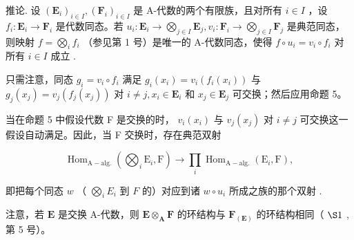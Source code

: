 推论. 设 \((\mathbf{E}_i)_{i\in I}, (\mathbf{F}_i)_{i\in I}\) 是 A-代数的两个有限族，且对所有 \(i\in I\) ，设 \(f_i: \mathbf{E}_i \to \mathbf{F}_i\) 是代数同态。若 \(u_i: \mathbf{E}_i \to \bigotimes_{j\in I} \mathbf{E}_{j}, v_i: \mathbf{F}_i \to \bigotimes_{j\in I} \mathbf{F}_j\) 是典范同态，则映射 \(f = \bigotimes_{i} f_i\) （参见第 1 号）是唯一的 A-代数同态，使得 \(f \circ u_i = v_i \circ f_i\) 对所有 \(i\in I\) 成立 .

只需注意，同态 \(g_{i} = v_{i} \circ f_{i}\) 满足 \(g_{i}(x_{i}) = v_{i}(f_{i}(x_{i}))\) 与 \(g_{j}(x_{j}) = v_{j}(f_{j}(x_{j}))\) 对 \(i \neq j, x_{i} \in \mathbf{E}_{i}\) 和 \(x_{j} \in \mathbf{E}_{j}\) 可交换；然后应用命题 5。

当在命题 5 中假设代数 F 是交换的时， \(v_{i}(x_{i})\) 与 \(v_{j}(x_{j})\) 对 \(i \neq j\) 可交换这一假设自动满足。因此，当 F 交换时，存在典范双射

\[
\operatorname{Hom} _ {\mathrm{A-alg.}} \left(\bigotimes_ {i} \mathrm{E} _ {i}, \mathrm{F}\right)\rightarrow \prod_ {i} \operatorname{Hom} _ {\mathrm{A-alg.}} (\mathrm{E} _ {i}, \mathrm{F}),\tag{6}
\]

即把每个同态 \(w\) （ \(\bigotimes_{i} E_{i}\) 到 \(F\) 的）对应到诸 \(w \circ u_{i}\) 所成之族的那个双射 .

注意，若 \(\mathbf{E}\) 是交换 A-代数，则 \(\mathbf{E} \otimes_{\mathbf{A}} \mathbf{F}\) 的环结构与 \(\mathbf{F}_{(\mathbf{E})}\) 的环结构相同（ \(\S 1\) , 第 5 号）。


